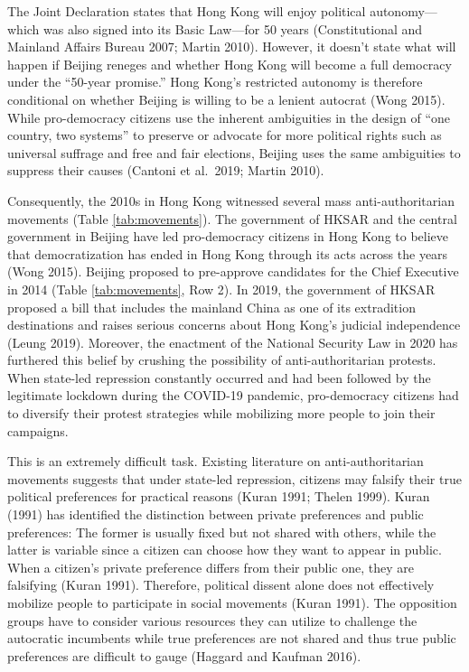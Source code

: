 \documentclass[letterpaper, 12pt]{article}
\begin{document}
The Joint Declaration states that Hong Kong will enjoy political autonomy---which was also signed into its Basic Law---for 50 years (Constitutional and Mainland Affairs Bureau 2007; Martin 2010). However, it doesn't state what will happen if Beijing reneges and whether Hong Kong will become a full democracy under the ``50-year promise.'' Hong Kong's restricted autonomy is therefore conditional on whether Beijing is willing to be a lenient autocrat (Wong 2015). While pro-democracy citizens use the inherent ambiguities in the design of ``one country, two systems'' to preserve or advocate for more political rights such as universal suffrage and free and fair elections, Beijing uses the same ambiguities to suppress their causes (Cantoni et al.\ 2019; Martin 2010). 

Consequently, the 2010s in Hong Kong witnessed several mass anti-authoritarian movements (Table \ref{tab:movements}). The government of HKSAR and the central government in Beijing have led pro-democracy citizens in Hong Kong to believe that democratization has ended in Hong Kong through its acts across the years (Wong 2015). Beijing proposed to pre-approve candidates for the Chief Executive in 2014 (Table \ref{tab:movements}, Row 2). In 2019, the government of HKSAR proposed a bill that includes the mainland China as one of its extradition destinations and raises serious concerns about Hong Kong's judicial independence (Leung 2019). Moreover, the enactment of the National Security Law in 2020 has furthered this belief by crushing the possibility of anti-authoritarian protests. When state-led repression constantly occurred and had been followed by the legitimate lockdown during the COVID-19 pandemic, pro-democracy citizens had to diversify their protest strategies while mobilizing more people to join their campaigns.

This is an extremely difficult task. Existing literature on anti-authoritarian movements suggests that under state-led repression, citizens may falsify their true political preferences for practical reasons (Kuran 1991; Thelen 1999). Kuran (1991) has identified the distinction between private preferences and public preferences: The former is usually fixed but not shared with others, while the latter is variable since a citizen can choose how they want to appear in public. When a citizen's private preference differs from their public one, they are falsifying (Kuran 1991). Therefore, political dissent alone does not effectively mobilize people to participate in social movements (Kuran 1991). The opposition groups have to consider various resources they can utilize to challenge the autocratic incumbents while true preferences are not shared and thus true public preferences are difficult to gauge (Haggard and Kaufman 2016). 
\end{document}

